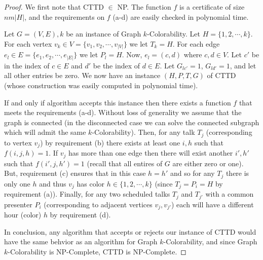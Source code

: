 \documentclass{svjour3}                     %
\begin{document}
\begin{proof}\label{cttd_np}
	We first note that CTTD $\in$ NP. The function $f$ is a certificate of size $nm|H|$, and the requirements on $f$ (a-d) are easily checked in polynomial time.
	
	Let $G=(V,E),k$ be an instance of Graph $k$-Colorability. Let $H=\{1, 2, \cdots, k\}$. For each vertex $v_k \in V=\{v_1, v_2, \cdots, v_{|V|}\}$ we let $T_k = H$. For each edge $e_l \in E=\{e_1, e_2, \cdots, e_{|E|}\}$ we let $P_l = H$. Now, $e_l = (c,d)$ where $c,d \in V$. Let $c'$ be in the index of $c \in E$ and $d'$ be the index of $d \in E$. Let $G_{lc'} = 1$, $G_{ld'} = 1$, and let all other entries be zero. We now have an instance $(H, P, T, G)$ of CTTD (whose construction was easily computed in polynomial time). 
	
	If and only if algorithm accepts this instance then there exists a function $f$ that meets the requirements (a-d). Without loss of generality we assume that the graph is connected (in the disconnected case we can solve the connected subgraph which will admit the same $k$-Colorability). Then, for any talk $T_j$ (corresponding to vertex $v_j$)  by requirement (b) there exists at least one $i, h$ such that $f(i,j,h) = 1$. If $v_j$ has more than one edge then there will exist another $i',h'$ such that $f(i',j,h')=1$ (recall that all entires of $G$ are either zero or one). But, requirement (c) ensures that in this case $h=h'$ and so for any $T_j$ there is only one $h$ and thus $v_j$ has color $h \in \{1,2,\cdots,k\}$ (since $T_j=P_i=H$ by requirement (a)). Finally, for any two scheduled talks $T_j$ and $T_{j'}$ with a common presenter $P_i$ (corresponding to adjacent vertices $v_j, v_{j'}$) each will have a different hour (color) $h$ by requirement (d).
	
	In conclusion, any algorithm that accepts or rejects our instance of CTTD would have the same behvior as an algorithm for Graph $k$-Colorability, and since Graph $k$-Colorability is NP-Complete, CTTD is NP-Complete.
\end{proof}
\end{document}
